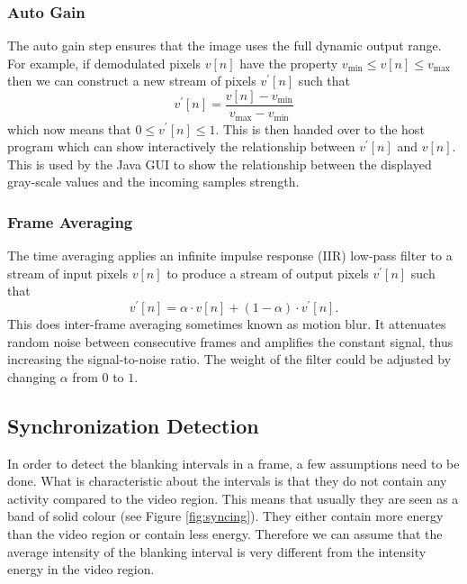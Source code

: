 \documentclass[a4paper,12pt,twoside,openright]{report}
\begin{document}
\subsubsection{Auto Gain}

The auto gain step ensures that the image uses the full dynamic output range. For example, if demodulated pixels $v[n]$ have the property $v_\text{min} \leq v[n] \leq v_\text{max}$ then we can construct a new stream of pixels $v^{\prime}[n]$ such that
$$v^{\prime}[n] = \frac{v[n] - v_\text{min}}{v_\text{max} - v_\text{min}}$$
which now means that $0 \leq v^{\prime}[n] \leq 1$. This is then handed over to the host program which can show interactively the relationship between $v^{\prime}[n]$ and $v[n]$. This is used by the Java GUI to show the relationship between the displayed gray-scale values and the incoming samples strength.

\subsubsection{Frame Averaging}

The time averaging applies an infinite impulse response (IIR) low-pass filter to a stream of input pixels $v[n]$ to produce a stream of output pixels $v^{\prime}[n]$ such that
$$v^{\prime}[n] =  \alpha \cdot v[n] + (1 - \alpha) \cdot v^{\prime}[n].$$
This does inter-frame averaging sometimes known as motion blur. It attenuates random noise between consecutive frames and amplifies the constant signal, thus increasing the signal-to-noise ratio. The weight of the filter could be adjusted by changing $\alpha$ from $0$ to $1$.

\subsection{Synchronization Detection}

In order to detect the blanking intervals in a frame, a few assumptions need to be done. What is characteristic about the intervals is that they do not contain any activity compared to the video region. This means that usually they are seen as a band of solid colour (see Figure \ref{fig:syncing}). They either contain more energy than the video region or contain less energy. Therefore we can assume that the average intensity of the blanking interval is very different from the intensity energy in the video region.
\end{document}
